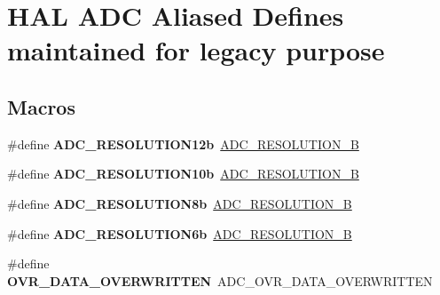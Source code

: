 \hypertarget{group___h_a_l___a_d_c___aliased___defines}{\section{H\-A\-L A\-D\-C Aliased Defines maintained for legacy purpose}
\label{group___h_a_l___a_d_c___aliased___defines}
}
\subsection*{Macros}
\begin{DoxyCompactItemize}
\item 
\hypertarget{group___h_a_l___a_d_c___aliased___defines_ga6d328c588ea6f273ca698d48441a2a71}{\#define {\bfseries A\-D\-C\-\_\-\-R\-E\-S\-O\-L\-U\-T\-I\-O\-N12b}~\hyperlink{group___a_d_c___resolution_ga49c8408a1cdbf97bbf29234c3770fa74}{A\-D\-C\-\_\-\-R\-E\-S\-O\-L\-U\-T\-I\-O\-N\-\_\-B}}\label{group___h_a_l___a_d_c___aliased___defines_ga6d328c588ea6f273ca698d48441a2a71}

\item 
\hypertarget{group___h_a_l___a_d_c___aliased___defines_gaa695d7ca46602fd4317d5f6a7a2ee071}{\#define {\bfseries A\-D\-C\-\_\-\-R\-E\-S\-O\-L\-U\-T\-I\-O\-N10b}~\hyperlink{group___a_d_c___resolution_ga91289e269eb3080d25301909c0f417e5}{A\-D\-C\-\_\-\-R\-E\-S\-O\-L\-U\-T\-I\-O\-N\-\_\-B}}\label{group___h_a_l___a_d_c___aliased___defines_gaa695d7ca46602fd4317d5f6a7a2ee071}

\item 
\hypertarget{group___h_a_l___a_d_c___aliased___defines_ga96b87d1645b3ae2e4af88daa006decc4}{\#define {\bfseries A\-D\-C\-\_\-\-R\-E\-S\-O\-L\-U\-T\-I\-O\-N8b}~\hyperlink{group___a_d_c___resolution_ga39925af93719877bdcc5664e4b95e69a}{A\-D\-C\-\_\-\-R\-E\-S\-O\-L\-U\-T\-I\-O\-N\-\_\-B}}\label{group___h_a_l___a_d_c___aliased___defines_ga96b87d1645b3ae2e4af88daa006decc4}

\item 
\hypertarget{group___h_a_l___a_d_c___aliased___defines_gaeaba9f99d20e7305507044f975925622}{\#define {\bfseries A\-D\-C\-\_\-\-R\-E\-S\-O\-L\-U\-T\-I\-O\-N6b}~\hyperlink{group___a_d_c___resolution_ga24c5226e05db78b4065f2f187d497b04}{A\-D\-C\-\_\-\-R\-E\-S\-O\-L\-U\-T\-I\-O\-N\-\_\-B}}\label{group___h_a_l___a_d_c___aliased___defines_gaeaba9f99d20e7305507044f975925622}

\item 
\hypertarget{group___h_a_l___a_d_c___aliased___defines_ga46d2fd3222a716456b74ad881eb34039}{\#define {\bfseries O\-V\-R\-\_\-\-D\-A\-T\-A\-\_\-\-O\-V\-E\-R\-W\-R\-I\-T\-T\-E\-N}~A\-D\-C\-\_\-\-O\-V\-R\-\_\-\-D\-A\-T\-A\-\_\-\-O\-V\-E\-R\-W\-R\-I\-T\-T\-E\-N}\label{group___h_a_l___a_d_c___aliased___defines_ga46d2fd3222a716456b74ad881eb34039}


\end{DoxyCompactItemize}
